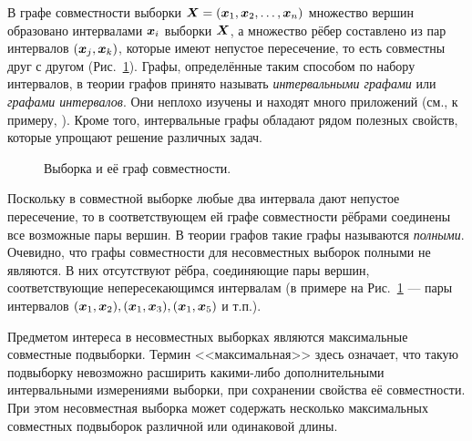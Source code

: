 \documentclass[a5paper,openany]{book}
\newcommand{\mbf}[1]{\protect\text{\boldmath$#1$}}
\begin{document}
В графе совместности выборки $\mbf{X} = (\mbf{x}_{1}, \mbf{x}_{2}, \ldots, \mbf{x}_{n} )$ 
множество вершин образовано интервалами $\mbf{x}_{i}$ выборки $\mbf{X}$, а множество 
рёбер составлено из пар интервалов $(\mbf{x}_{j},\mbf{x}_{k})$, которые имеют непустое 
пересечение, то есть совместны друг с другом (Рис.~\ref{CompatGraphPic}). Графы, 
определённые таким способом по набору интервалов, в теории графов принято называть 
\emph{интервальными графами} или \emph{графами интервалов}. Они неплохо изучены и находят 
много приложений (см., к примеру, \cite{Roberts}). Кроме того, интервальные графы обладают 
рядом полезных свойств, которые упрощают решение различных задач. 
  
 
\begin{figure}[!ht]
\centering 
    \begin{subfigure}{.61\textwidth}
        \centering
        
    \end{subfigure} 
    \hfill 
    \begin{subfigure}{.36\textwidth}
        \centering
        
        \begin{minipage}{.1cm}
        \vfill
        \end{minipage}
    \end{subfigure} 
    \caption{Выборка и её граф совместности.}
    \label{CompatGraphPic}
\end{figure}
 
  
Поскольку в совместной выборке любые два интервала дают непустое пересечение, то 
в соответствующем ей графе совместности рёбрами соединены все возможные пары вершин. 
В теории графов такие графы называются \emph{полными}. Очевидно, что 
графы совместности для несовместных выборок полными не являются. В них отсутствуют рёбра, 
соединяющие пары вершин, соответствующие непересекающимся интервалам (в примере на 
Рис.~\ref{CompatGraphPic} --- пары интервалов $(\mbf{x}_{1},\mbf{x}_{2}), (\mbf{x}_{1}, 
\mbf{x}_{3}), (\mbf{x}_{1},\mbf{x}_{5})$ и т.п.).

Предметом интереса в несовместных выборках являются максимальные совместные подвыборки. 
Термин <<максимальная>> здесь означает, что такую подвыборку невозможно расширить 
какими-либо дополнительными интервальными измерениями выборки, при сохранении свойства 
её совместности. При этом несовместная выборка может содержать несколько максимальных 
совместных подвыборок различной или одинаковой длины. 
\end{document}
